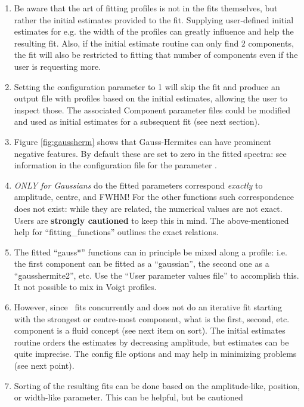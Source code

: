 \documentclass[oneside,11pt]{starlink}
\begin{document}
\begin{enumerate}
\item Be aware that the art of fitting profiles is not in the fits
  themselves, but rather the initial estimates provided to the
  fit. Supplying user-defined initial estimates for e.g. the width of
  the profiles can greatly influence and help the resulting fit. Also, if
  the initial estimate routine can only find 2 components, the fit will
  also be restricted to fitting that number of components even if the
  user is requesting more.
\item Setting the configuration parameter  to 1
  will skip the fit and produce an output file with profiles based on the
  initial estimates, allowing the user to inspect those. The associated
  Component parameter files could be modified and used as initial estimates
  for a subsequent fit (see next section).
\item Figure \ref{fig:gaussherm} shows that Gauss-Hermites can have
  prominent negative features. By default these are set to zero in the
  fitted spectra: see information in the configuration file for the
  parameter .
\item {\em ONLY for Gaussians} do the fitted parameters correspond
  {\em exactly} to amplitude, centre, and FWHM! For the other functions
  such correspondence does not exist: while they are related, the
  numerical values are not exact. Users are \textbf{strongly cautioned} to
  keep this in mind. The above-mentioned help for ``fitting\_functions''
  outlines the exact relations.
\item The fitted ``gauss*'' functions can in principle be mixed along a
  profile: i.e. the first component can be fitted as a ``gaussian'', the
  second one as a ``gausshermite2'', etc. Use the 
  ``User parameter values file'' to accomplish this. It not possible to
  mix in Voigt profiles.
\item However, since \fitdd\ fits concurrently and does not do an
  iterative fit starting with the strongest or centre-most component,
  what is the first, second, etc. component is a fluid concept
  (see next item on sort).  The initial estimates routine orders the
  estimates by decreasing amplitude, but estimates can be quite imprecise.
  The config file options  and 
  may help in minimizing problems (see next point).
\item Sorting of the resulting fits can be done based on the amplitude-like,
  position, or width-like parameter. This can be helpful, but be cautioned

\end{enumerate}
\end{document}
